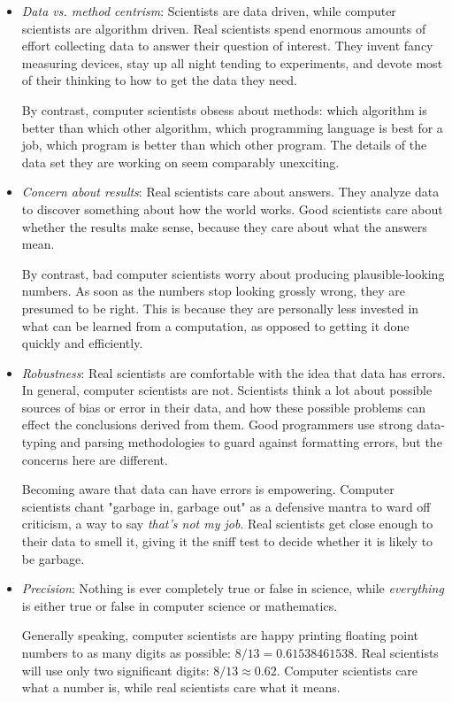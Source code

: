 \documentclass[10pt]{article}
\begin{document}
\begin{itemize}
  \item \textit{Data vs. method centrism}: Scientists are data driven, while computer scientists are algorithm driven. Real scientists spend enormous amounts of effort collecting data to answer their question of interest. They invent fancy measuring devices, stay up all night tending to experiments, and devote most of their thinking to how to get the data they need.

By contrast, computer scientists obsess about methods: which algorithm is better than which other algorithm, which programming language is best for a job, which program is better than which other program. The details of the data set they are working on seem comparably unexciting.

  \item \textit{Concern about results}: Real scientists care about answers. They analyze data to discover something about how the world works. Good scientists care about whether the results make sense, because they care about what the answers mean.

By contrast, bad computer scientists worry about producing plausible-looking numbers. As soon as the numbers stop looking grossly wrong, they are presumed to be right. This is because they are personally less invested in what can be learned from a computation, as opposed to getting it done quickly and efficiently.

  \item \textit{Robustness}: Real scientists are comfortable with the idea that data has errors. In general, computer scientists are not. Scientists think a lot about possible sources of bias or error in their data, and how these possible problems can effect the conclusions derived from them. Good programmers use strong data-typing and parsing methodologies to guard against formatting errors, but the concerns here are different.

Becoming aware that data can have errors is empowering. Computer scientists chant "garbage in, garbage out" as a defensive mantra to ward off criticism, a way to say \textit{that's not my job}. Real scientists get close enough to their data to smell it, giving it the sniff test to decide whether it is likely to be garbage.

  \item \textit{Precision}: Nothing is ever completely true or false in science, while \textit{everything} is either true or false in computer science or mathematics.

Generally speaking, computer scientists are happy printing floating point numbers to as many digits as possible: \(8/13=0.61538461538\). Real scientists will use only two significant digits: \(8/13 \approx 0.62\). Computer scientists care what a number is, while real scientists care what it means.
\end{itemize}
\end{document}
